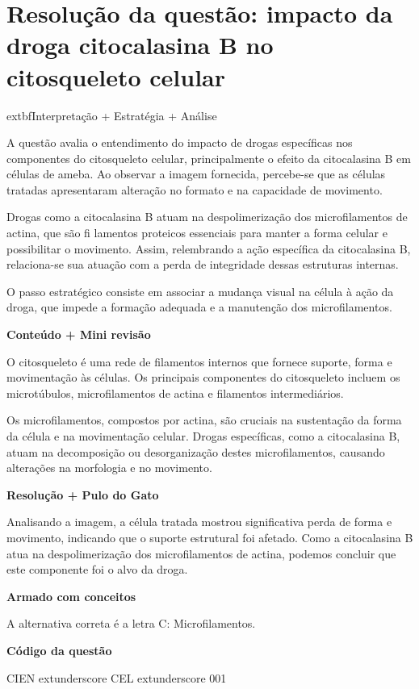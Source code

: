 \documentclass{article}
\begin{document}
\section*{Resolução da questão: impacto da droga citocalasina B no citosqueleto celular}

	extbf{Interpretação + Estratégia + Análise}

A questão avalia o entendimento do impacto de drogas específicas nos componentes do citosqueleto celular, principalmente o efeito da citocalasina B em células de ameba. Ao observar a imagem fornecida, percebe-se que as células tratadas apresentaram alteração no formato e na capacidade de movimento.

Drogas como a citocalasina B atuam na despolimerização dos microfilamentos de actina, que são fi lamentos proteicos essenciais para manter a forma celular e possibilitar o movimento. Assim, relembrando a ação específica da citocalasina B, relaciona-se sua atuação com a perda de integridade dessas estruturas internas.

O passo estratégico consiste em associar a mudança visual na célula à ação da droga, que impede a formação adequada e a manutenção dos microfilamentos.

\textbf{Conteúdo + Mini revisão}

O citosqueleto é uma rede de filamentos internos que fornece suporte, forma e movimentação às células. Os principais componentes do citosqueleto incluem os microtúbulos, microfilamentos de actina e filamentos intermediários.

Os microfilamentos, compostos por actina, são cruciais na sustentação da forma da célula e na movimentação celular. Drogas específicas, como a citocalasina B, atuam na decomposição ou desorganização destes microfilamentos, causando alterações na morfologia e no movimento.

\textbf{Resolução + Pulo do Gato}

Analisando a imagem, a célula tratada mostrou significativa perda de forma e movimento, indicando que o suporte estrutural foi afetado. Como a citocalasina B atua na despolimerização dos microfilamentos de actina, podemos concluir que este componente foi o alvo da droga.

\textbf{Armado com conceitos}

A alternativa correta é a letra C: Microfilamentos.

\textbf{Código da questão}

CIEN	extunderscore CEL	extunderscore 001
\end{document}
